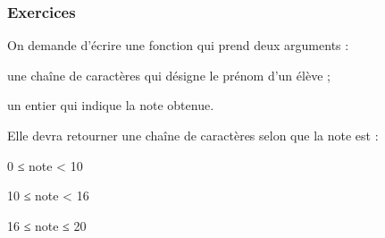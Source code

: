 \subsubsection[Exercices]{Exercices}
\label{subsub:XI.3.3.3}

\begin{exercise}[title=Notes des élèves, level=basic]
On demande d'écrire une fonction qui prend deux arguments :
\begin{jazzitemize}
\item une chaîne de caractères qui désigne le prénom d'un élève ;
\item un entier qui indique la note obtenue.
\end{jazzitemize}
Elle devra retourner une chaîne de caractères selon que la note est :
\begin{multicols}{3}
\begin{jazzitemize}
\item 0 ≤ note < 10
\item 10 ≤ note < 16
\item 16 ≤ note ≤ 20
\end{jazzitemize}
\end{multicols}
\end{exercise}

